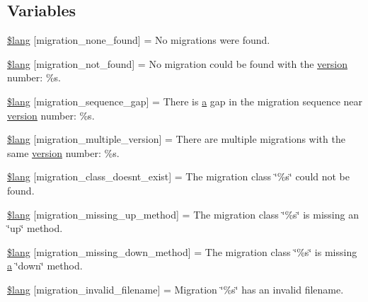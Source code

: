 \subsection*{Variables}
\begin{DoxyCompactItemize}
\item 
\hyperlink{migration__lang_8php_affa6337f0973de810b3c61491deae6b1}{\$lang} \mbox{[}\textquotesingle{}migration\+\_\+none\+\_\+found\textquotesingle{}\mbox{]} = \textquotesingle{}No migrations were found.\textquotesingle{}
\item 
\hyperlink{migration__lang_8php_a92dd777422d70950993d43f4d0c31b1b}{\$lang} \mbox{[}\textquotesingle{}migration\+\_\+not\+\_\+found\textquotesingle{}\mbox{]} = \textquotesingle{}No migration could be found with the \hyperlink{jquery_8canvasjs_8min_8js_a202e93b489b0bc18cd28b824031145a4}{version} number\+: \%s.\textquotesingle{}
\item 
\hyperlink{migration__lang_8php_ab1f43d98bc1365f4b753d783a8802697}{\$lang} \mbox{[}\textquotesingle{}migration\+\_\+sequence\+\_\+gap\textquotesingle{}\mbox{]} = \textquotesingle{}There is \hyperlink{bootstrap_8min_8js_a1f5870dcf487187f13d5fd328ed9e6e7}{a} gap in the migration sequence near \hyperlink{jquery_8canvasjs_8min_8js_a202e93b489b0bc18cd28b824031145a4}{version} number\+: \%s.\textquotesingle{}
\item 
\hyperlink{migration__lang_8php_a1a98130d04f280e6a5f6f509179f9e01}{\$lang} \mbox{[}\textquotesingle{}migration\+\_\+multiple\+\_\+version\textquotesingle{}\mbox{]} = \textquotesingle{}There are multiple migrations with the same \hyperlink{jquery_8canvasjs_8min_8js_a202e93b489b0bc18cd28b824031145a4}{version} number\+: \%s.\textquotesingle{}
\item 
\hyperlink{migration__lang_8php_a141dceda5b8294f6e4ddf7e5da6fe71d}{\$lang} \mbox{[}\textquotesingle{}migration\+\_\+class\+\_\+doesnt\+\_\+exist\textquotesingle{}\mbox{]} = \textquotesingle{}The migration class \char`\"{}\%s\char`\"{} could not be found.\textquotesingle{}
\item 
\hyperlink{migration__lang_8php_a4bc9c60a4f078d1845d1d72370c363e8}{\$lang} \mbox{[}\textquotesingle{}migration\+\_\+missing\+\_\+up\+\_\+method\textquotesingle{}\mbox{]} = \textquotesingle{}The migration class \char`\"{}\%s\char`\"{} is missing an \char`\"{}up\char`\"{} method.\textquotesingle{}
\item 
\hyperlink{migration__lang_8php_a6e835ce0b327b8ea1df42bfc7a59f1cd}{\$lang} \mbox{[}\textquotesingle{}migration\+\_\+missing\+\_\+down\+\_\+method\textquotesingle{}\mbox{]} = \textquotesingle{}The migration class \char`\"{}\%s\char`\"{} is missing \hyperlink{bootstrap_8min_8js_a1f5870dcf487187f13d5fd328ed9e6e7}{a} \char`\"{}down\char`\"{} method.\textquotesingle{}
\item 
\hyperlink{migration__lang_8php_a75ef7572f25674e4dd1e36a0d61080fa}{\$lang} \mbox{[}\textquotesingle{}migration\+\_\+invalid\+\_\+filename\textquotesingle{}\mbox{]} = \textquotesingle{}Migration \char`\"{}\%s\char`\"{} has an invalid filename.\textquotesingle{}
\end{DoxyCompactItemize}


